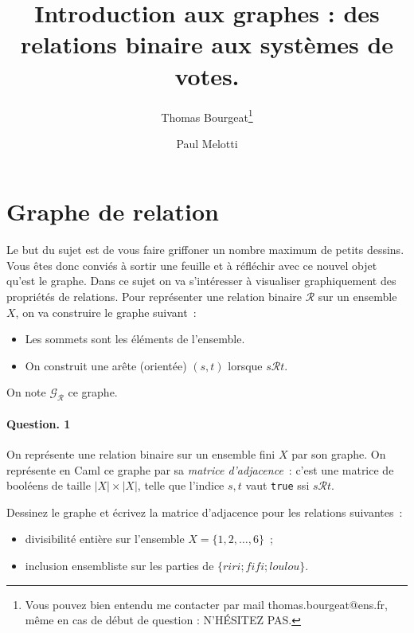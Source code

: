 \documentclass[10pt,a4paper]{article}
\begin{document}
\title{Introduction aux graphes : des relations binaire aux systèmes de votes.}
\author{Thomas Bourgeat\footnote{Vous pouvez bien entendu me contacter par mail thomas.bourgeat@ens.fr, même en cas de début de question : N'HÉSITEZ PAS.}\and Paul Melotti}
\maketitle{}

\section{Graphe de relation}

Le but du sujet est de vous faire griffoner un nombre maximum de petits
dessins. Vous êtes donc conviés à sortir une feuille et à réfléchir avec
ce nouvel objet qu'est le graphe. 
Dans ce sujet on va s'intéresser à visualiser graphiquement des
propriétés de relations. Pour représenter une relation binaire $\mathcal{R}$ sur un ensemble
$X$, on va construire le graphe suivant~: 
\begin{itemize}
\item Les sommets sont les éléments de l'ensemble.
\item On construit une arête (orientée) $(s,t)$ lorsque $s \mathcal{R} t$.
\end{itemize}
On note $\mathcal{G}_{\mathcal{R}}$ ce graphe.
\paragraph{Question. 1\\}
On représente une relation binaire sur un ensemble fini $X$ par son graphe.
On représente en Caml ce graphe par sa
\textit{matrice d'adjacence}~: c'est une matrice de booléens de taille 
$|X| \times |X|$, telle que l'indice $s,t$ vaut \texttt{true} ssi 
$s\mathcal{R} t$.

Dessinez le graphe et écrivez la matrice d'adjacence pour les relations 
suivantes~:
\begin{itemize}
\item divisibilité entière sur l'ensemble $X=\{1,2,\dots,6\}$~;
\item inclusion ensembliste sur les parties de $\{riri;fifi;loulou\}$.
\end{itemize}
\end{document}
